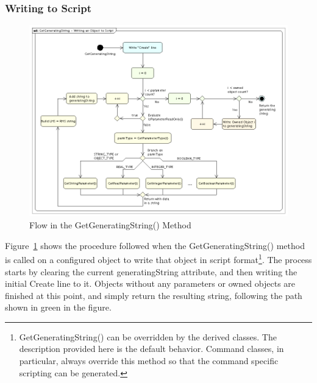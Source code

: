 \subsubsection{Writing to Script}

\begin{figure}[htb]
\begin{center}
\includegraphics[385,338]{Images/GetGeneratingStringWritinganObjecttoScript.png}
\caption{\label{figure:GetGeneratingStringDetails}Flow in the GetGeneratingString() Method}
\end{center}
\end{figure}

Figure~\ref{figure:GetGeneratingStringDetails} shows the procedure followed when the
GetGeneratingString() method is called on a configured object to write that object in script
format\footnote{GetGeneratingString() can be overridden by the derived classes.  The description
provided here is the default behavior.  Command classes, in particular, always override this
method so that the command specific scripting can be generated.}. The process starts by clearing the
current generatingString attribute, and then writing the initial Create line to it.  Objects
without any parameters or owned objects are finished at this point, and simply return the resulting
string, following the path shown in green in the figure.

